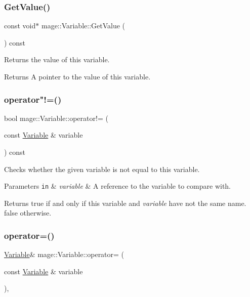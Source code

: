 \subsubsection{\texorpdfstring{Get\+Value()}{GetValue()}}
{\footnotesize\ttfamily const void$\ast$ mage\+::\+Variable\+::\+Get\+Value (\begin{DoxyParamCaption}{ }\end{DoxyParamCaption}) const}

Returns the value of this variable.

\begin{DoxyReturn}{Returns}
A pointer to the value of this variable. 
\end{DoxyReturn}
\hypertarget{structmage_1_1_variable_a7983cd74a25e3998abac8d89245d1fd9}{}\label{structmage_1_1_variable_a7983cd74a25e3998abac8d89245d1fd9} 
\subsubsection{\texorpdfstring{operator"!=()}{operator!=()}}
{\footnotesize\ttfamily bool mage\+::\+Variable\+::operator!= (\begin{DoxyParamCaption}\item[{const \hyperlink{structmage_1_1_variable}{Variable} \&}]{variable }\end{DoxyParamCaption}) const}

Checks whether the given variable is not equal to this variable.


\begin{DoxyParams}[1]{Parameters}
\mbox{\tt in}  & {\em variable} & A reference to the variable to compare with. \\
\hline
\end{DoxyParams}
\begin{DoxyReturn}{Returns}
{\ttfamily true} if and only if this variable and {\itshape variable} have not the same name. {\ttfamily false} otherwise. 
\end{DoxyReturn}
\hypertarget{structmage_1_1_variable_a99029d04b45f356b9681787fdab8a139}{}\label{structmage_1_1_variable_a99029d04b45f356b9681787fdab8a139} 
\subsubsection{\texorpdfstring{operator=()}{operator=()}}
{\footnotesize\ttfamily \hyperlink{structmage_1_1_variable}{Variable}\& mage\+::\+Variable\+::operator= (\begin{DoxyParamCaption}\item[{const \hyperlink{structmage_1_1_variable}{Variable} \&}]{variable }\end{DoxyParamCaption})\hspace{0.3cm}{\ttfamily [private]}, {\ttfamily [delete]}}

